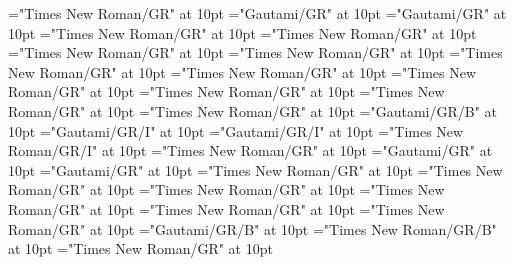 \documentclass[a4paper]{article}
\begin{document}
\font\translationsxitemexamplessensesensesentryletData="Times New Roman/GR" at 10pt
\font\translationLdtetranslationsxitemexamplessensesensesentryletData="Gautami/GR" at 10pt
\font\spantetranslationLdtetranslationsxitemexamplessensesensesentryletData="Gautami/GR" at 10pt
\font\spanentranslationLdtetranslationsxitemexamplessensesensesentryletData="Times New Roman/GR" at 10pt
\font\spanenexamplessensesensesentryletData="Times New Roman/GR" at 10pt
\font\primaryrefsentryletData="Times New Roman/GR" at 10pt
\font\spanenprimaryrefsentryletData="Times New Roman/GR" at 10pt
\font\entryreftypeprimaryrefsentryletData="Times New Roman/GR" at 10pt
\font\LexEntryTypepublishStemEntryTypeAbbreviationPubenentryreftypeprimaryrefsentryletData="Times New Roman/GR" at 10pt
\font\spanenLexEntryTypepublishStemEntryTypeAbbreviationPubenentryreftypeprimaryrefsentryletData="Times New Roman/GR" at 10pt
\font\spanenentryreftypeprimaryrefsentryletData="Times New Roman/GR" at 10pt
\font\entryrefcomponentprimaryrefsentryletData="Times New Roman/GR" at 10pt
\font\aentryrefcomponentprimaryrefsentryletData="Times New Roman/GR" at 10pt
\font\LexEntrypublishStemComponentTargetHeadWordRefggoTeluINaentryrefcomponentprimaryrefsentryletData="Gautami/GR/B" at 10pt
\font\exampleggoTeluINexamplessensesensesentryletData="Gautami/GR/I" at 10pt
\font\spanggoTeluINexampleggoTeluINexamplessensesensesentryletData="Gautami/GR/I" at 10pt
\font\spanenexampleggoTeluINexamplessensesensesentryletData="Times New Roman/GR/I" at 10pt
\font\translationsexamplessensesensesentryletData="Times New Roman/GR" at 10pt
\font\translationLdtetranslationsexamplessensesensesentryletData="Gautami/GR" at 10pt
\font\spantetranslationLdtetranslationsexamplessensesensesentryletData="Gautami/GR" at 10pt
\font\spanentranslationLdtetranslationsexamplessensesensesentryletData="Times New Roman/GR" at 10pt
\font\complexformrefsentryletData="Times New Roman/GR" at 10pt
\font\complexformtypecomplexformrefsentryletData="Times New Roman/GR" at 10pt
\font\LexEntryTypepublishStemComplexFormTypeReverseAbbrPubencomplexformtypecomplexformrefsentryletData="Times New Roman/GR" at 10pt
\font\spanenLexEntryTypepublishStemComplexFormTypeReverseAbbrPubencomplexformtypecomplexformrefsentryletData="Times New Roman/GR" at 10pt
\font\spanencomplexformtypecomplexformrefsentryletData="Times New Roman/GR" at 10pt
\font\complexformformggoTeluINcomplexformrefsentryletData="Gautami/GR/B" at 10pt
\font\spanencomplexformformggoTeluINcomplexformrefsentryletData="Times New Roman/GR/B" at 10pt
\font\spanencomplexformrefsentryletData="Times New Roman/GR" at 10pt
\end{document}
